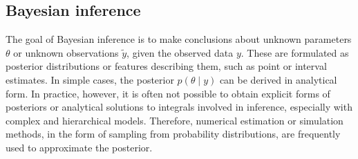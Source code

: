 




\subsection{Bayesian inference}\label{sec:bayesian-inference}

The goal of Bayesian inference is to make conclusions about unknown parameters
$\theta$ or unknown observations $\tilde{y}$, given the observed data $y$.
These are formulated as posterior distributions or features describing them,
such as point or interval estimates. In simple cases, the posterior $p(\theta \mid y)$
can be derived in analytical form. In practice, however, it is often not possible to obtain
explicit forms of posteriors or analytical solutions to integrals involved in
inference, especially with complex and hierarchical models. Therefore,
numerical estimation or simulation methods, in the form of sampling from
probability distributions, are frequently used to approximate the posterior.



